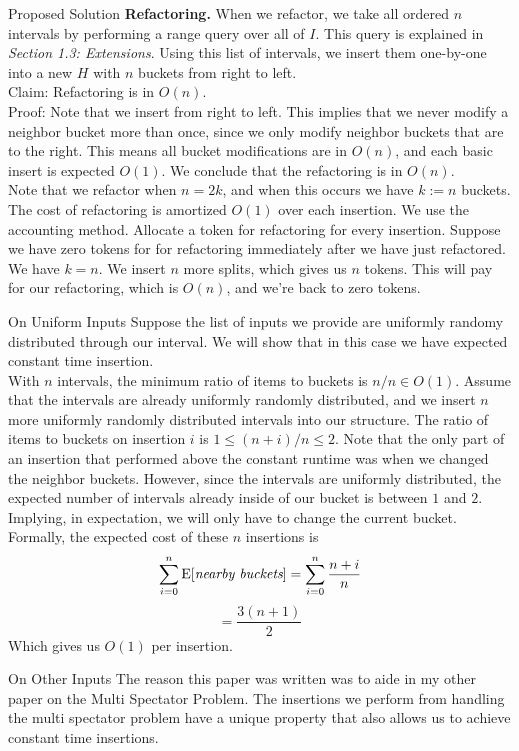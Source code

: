 \documentclass[11pt]{article}
\begin{document}
\begin{section}{Proposed Solution}
\textbf{Refactoring.} When we refactor, we take all ordered $n$ intervals by performing a range query over all of $I$. This query is explained in \emph{Section 1.3: Extensions}. Using this list of intervals, we insert them one-by-one into a new $H$ with $n$ buckets from right to left. \\

Claim: Refactoring is in $O(n)$.\\
Proof: Note that we insert from right to left. This implies that we never modify a neighbor bucket more than once, since we only modify neighbor buckets that are to the right. This means all bucket modifications are in $O(n)$, and each basic insert is expected $O(1)$. We conclude that the refactoring is in $O(n)$.\\

Note that we refactor when $n = 2k$, and when this occurs we have $k := n$ buckets. The cost of refactoring is amortized $O(1)$ over each insertion. We use the accounting method. Allocate a token for refactoring for every insertion. Suppose we have zero tokens for for refactoring immediately after we have just refactored. We have $k = n$. We insert $n$ more splits, which gives us $n$ tokens. This will pay for our refactoring, which is $O(n)$, and we're back to zero tokens.\\

\begin{subsection}{On Uniform Inputs}
Suppose the list of inputs we provide are uniformly randomy distributed through our interval. We will show that in this case we have expected constant time insertion.\\

With $n$ intervals, the minimum ratio of items to buckets is $n / n \in O(1)$. Assume that the intervals are already uniformly randomly distributed, and we insert $n$ more uniformly randomly distributed intervals into our structure. The ratio of items to buckets on insertion $i$ is $1 \le (n + i)/n \le 2$. Note that the only part of an insertion that performed above the constant runtime was when we changed the neighbor buckets. However, since the intervals are uniformly distributed, the expected number of intervals already inside of our bucket is between $1$ and $2$. Implying, in expectation, we will only have to change the current bucket. \\

Formally, the expected cost of these $n$ insertions is 
\[\sum_{i=0}^n \mbox{E}[\emph{nearby buckets}] = \sum_{i=0}^n \frac{n+i}{n}\]
\[ = \frac{3(n+1)}{2}\]
Which gives us $O(1)$ per insertion.
\end{subsection}
\begin{subsection}{On Other Inputs}
The reason this paper was written was to aide in my other paper on the Multi Spectator Problem. The insertions we perform from handling the multi spectator problem have a unique property that also allows us to achieve constant time insertions. \\


\end{subsection}
\end{section}
\end{document}
